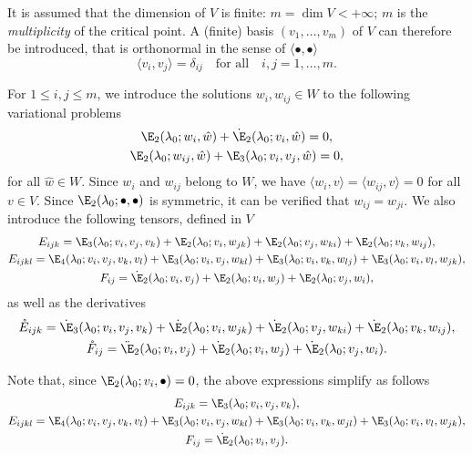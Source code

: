 It is assumed that the dimension of $V$ is finite: $m = \dim V < +\infty$; $m$ is the \emph{multiplicity} of the
critical point. A (finite) basis $(v_1, \ldots, v_m)$ of $V$ can therefore be introduced, that is orthonormal in the
sense of $\langle \bullet, \bullet \rangle$
\begin{equation}
  \langle v_i, v_j \rangle = \delta_{ij} \quad \text{for all} \quad i, j = 1, \ldots, m.
\end{equation}

For $1 \leq i, j \leq m$, we introduce the solutions $w_i, w_{ij} \in W$ to the following variational problems
\begin{gather}
  \label{eq:20220524134525}
  \E_2(\lambda_0; w_i, \hat{w}) + \dot{\E}_2(\lambda_0; v_i, \hat{w}) = 0,\\
  \label{eq:20220519164523}
  \E_2(\lambda_0; w_{i j}, \hat{w})+\E_3(\lambda_0; v_i, v_j, \hat{w}) = 0,
\end{gather}
for all $\hat{w} \in W$. Since $w_{i}$ and $w_{ij}$ belong to $W$, we have
$\langle w_{i}, v \rangle = \langle w_{ij}, v \rangle = 0$ for all $v \in V$. Since $\E_2(\lambda_0; \bullet, \bullet)$
is symmetric, it can be verified that $w_{ij}=w_{ji}$. We also introduce the following tensors, defined in $V$
\begin{gather}
  E_{ijk} = \E_3(\lambda_0; v_i, v_j, v_k) + \E_2(\lambda_0; v_i, w_{jk}) + \E_2(\lambda_0; v_j, w_{ki}) + \E_2(\lambda_0; v_k, w_{ij}),\\
  \label{eq:20221116155507}
  E_{ijkl} = \E_4(\lambda_0 ; v_i, v_j, v_k, v_l) + \E_3(\lambda_0 ; v_i, v_j, w_{kl}) + \E_3(\lambda_0 ; v_i, v_k, w_{lj}) + \E_3(\lambda_0 ; v_i, v_l, w_{jk}),\\
  F_{ij} = \dot{\E}_2(\lambda_0; v_i, v_j) + \E_2(\lambda_0; v_i, w_j) + \E_2(\lambda_0; v_j, w_i),
\end{gather}
as well as the derivatives
\begin{gather}
  \label{eq:20220615063626}
  \mathring{E}_{ijk} = \dot{\E}_3(\lambda_0; v_i, v_j, v_k) + \dot{\E_2}(\lambda_0; v_i, w_{jk}) + \dot{\E}_2(\lambda_0; v_j, w_{ki}) + \dot{\E}_2(\lambda_0; v_k, w_{ij}),\\
  \label{eq:20220615063633}
  \mathring{F}_{ij} = \ddot{\E}_2(\lambda_0; v_i, v_j) + \dot{\E}_2(\lambda_0; v_i, w_j) + \dot{\E}_2(\lambda_0; v_j, w_i).
\end{gather}

Note that, since $\E_2(\lambda_0; v_i, \bullet) = 0$, the above expressions simplify as follows
\begin{gather}
  \label{eq:20220524135619}
  E_{ijk} = \E_3(\lambda_0; v_i, v_j, v_k),\\
  \label{eq:20220524135553}
  E_{ijkl} = \E_4(\lambda_0 ; v_i, v_j, v_k, v_l) + \E_3(\lambda_0 ; v_i, v_j, w_{kl}) + \E_3(\lambda_0 ; v_i, v_k, w_{jl}) + \E_3(\lambda_0 ; v_i, v_l, w_{jk}),\\
  \label{eq:20220524135643}
  F_{ij} = \dot{\E}_2(\lambda_0; v_i, v_j).
\end{gather}

